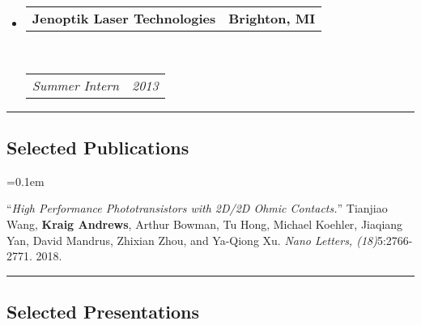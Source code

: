 \documentclass[10pt,letterpaper]{article}
\makeatletter
\newcommand{\headerrow}[2]
{\begin{tabular*}{\linewidth}{l@{\extracolsep{\fill}}r}
	#1 &
	#2 \\
\end{tabular*}}
\makeatother
\begin{document}
\begin{itemize}
	\item 
	\headerrow
		{\textbf{Jenoptik Laser Technologies}}
		{\textbf{Brighton, MI}}
	\\
	\headerrow
		{\emph{Summer Intern}}
		{\emph{2013}}
\end{itemize}

\hrule
\vspace{-0.4em}
\subsection*{Selected Publications}

\begin{enumerate*}
	\parskip=0.1em
	\item ``\emph{High Performance  Phototransistors with 2D/2D Ohmic Contacts.}''
		Tianjiao Wang, \textbf{Kraig Andrews}, Arthur Bowman, Tu Hong, Michael Koehler, Jiaqiang Yan, David Mandrus, Zhixian Zhou, and Ya-Qiong Xu. \emph{Nano Letters, (18)}5:2766-2771. 2018.
\end{enumerate*}

\hrule
\vspace{-0.4em}
\subsection*{Selected Presentations}
\end{document}
